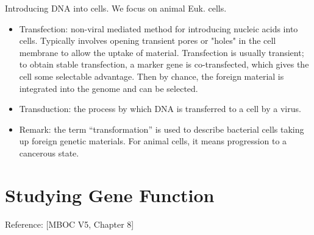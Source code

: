 \documentclass{report}
\begin{document}
Introducing DNA into cells. We focus on animal Euk. cells. 
\begin{itemize}
	\item Transfection: non-viral mediated method for introducing nucleic acids into cells. Typically involves opening transient pores or "holes" in the cell membrane to allow the uptake of material. Transfection is usually transient; to obtain stable transfection, a marker gene is co-transfected, which gives the cell some selectable advantage. Then by chance, the foreign material is integrated into the genome and can be selected. 
	
	\item Transduction: the process by which DNA is transferred to a cell by a virus. 
	
	\item Remark: the term ``transformation'' is used to describe bacterial cells taking up foreign genetic materials. For animal cells, it means progression to a cancerous state. 
\end{itemize}

\section{Studying Gene Function} 

Reference: [MBOC V5, Chapter 8]
\end{document}
